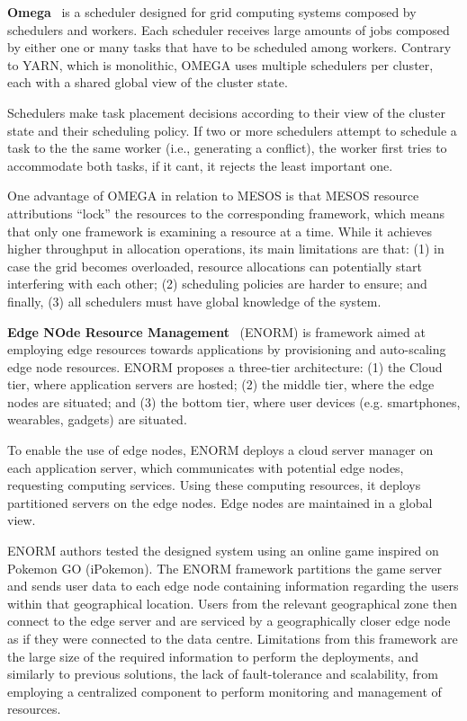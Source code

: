 \textbf{Omega}~\cite{41684} is a scheduler designed for grid computing systems composed by schedulers and workers. Each scheduler receives large amounts of jobs composed by either one or many tasks that have to be scheduled among workers. Contrary to YARN, which is monolithic, OMEGA uses multiple schedulers per cluster, each with a shared global view of the cluster state.

Schedulers make task placement decisions according to their view of the cluster state and their scheduling policy. If two or more schedulers attempt to schedule a task to the the same worker (i.e., generating a conflict), the worker first tries to accommodate both tasks, if it cant, it rejects the least important one.

One advantage of OMEGA in relation to MESOS is that MESOS resource attributions ``lock'' the resources to the corresponding framework,  which means that only one framework is examining a resource at a time. While it achieves higher throughput in allocation operations, its main limitations are that: (1) in case the grid becomes overloaded, resource allocations can potentially start interfering with each other; (2) scheduling policies are harder to ensure; and finally, (3) all schedulers must have global knowledge of the system.

\textbf{Edge NOde Resource Management}~\cite{wang2017enorm} (ENORM) is framework aimed at employing edge resources towards applications by provisioning and auto-scaling edge node resources. ENORM proposes a three-tier architecture: (1) the Cloud tier, where application servers are hosted; (2) the middle tier, where the edge nodes are situated; and (3) the bottom tier, where user devices (e.g. smartphones, wearables, gadgets) are situated.

To enable the use of edge nodes, ENORM deploys a cloud server manager on each application server, which communicates with potential edge nodes, requesting computing services. Using these computing resources, it deploys partitioned servers on the edge nodes. Edge nodes are maintained in a global view.

ENORM authors tested the designed system using an online game inspired on Pokemon GO (iPokemon)\cite{pokemonGo}. The ENORM framework partitions the game server and sends user data to each edge node containing information regarding the users within that geographical location. Users from the relevant geographical zone then connect to the edge server and are serviced by a geographically closer edge node as if they were connected to the data centre. Limitations from this framework are the large size of the required information to perform the deployments, and similarly to previous solutions, the lack of fault-tolerance and scalability, from employing a centralized component to perform monitoring and management of resources.

